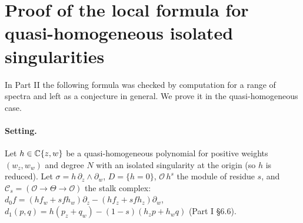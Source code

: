 \section{Proof of the local formula for quasi-homogeneous isolated singularities}\label{sec:local}
In Part II the following formula was checked by computation for a range of spectra and left as a conjecture in general. We prove it in the quasi-homogeneous case.

\paragraph{Setting.} Let $h\in\mathbb C\{z,w\}$ be a quasi-homogeneous polynomial for positive weights $(w_z,w_w)$ and degree $N$ with an isolated singularity at the origin (so $h$ is reduced). Let $\sigma=h\,\partial_z\wedge\partial_w$, $D=\{h=0\}$, $\mathcal O\,h^s$ the module of residue $s$, and $\mathcal C_s=(\mathcal O\to\Theta\to\mathcal O)$ the stalk complex: $d_0f=(hf_w+sfh_w)\partial_z-(hf_z+sfh_z)\partial_w$, $d_1(p,q)=h(p_z+q_w)-(1-s)(h_zp+h_wq)$ (Part I \S6.6).

